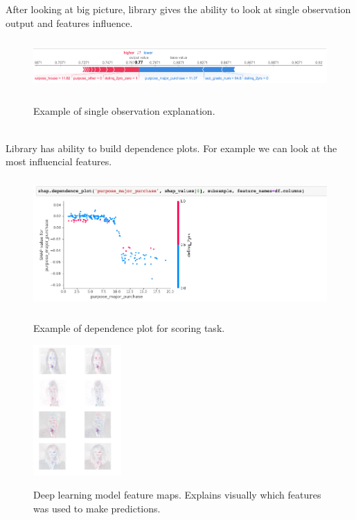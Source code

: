 After looking at big picture, library gives the ability to look at single observation output and features influence.
\begin{figure}[!htb]

\centering
\includegraphics[height=2cm]{shap_ex2.png}\\[0.5cm] 
\caption{Example of single observation explanation.}
\end{figure}
\\
Library has ability to build dependence plots. For example we can look at the most influencial features.

\begin{figure}[!htb]
\centering
\includegraphics[height=5cm]{shap_ex3.png}\\[0.5cm] 
\caption{Example of dependence plot for scoring task.}
\end{figure}

\begin{figure}[!htb]
\centering
\includegraphics[height=5cm]{shap_ex4.png}\\[0.5cm] 
\caption{Deep learning model feature maps. Explains visually which features was used to make predictions.}
\end{figure}
\newpage
